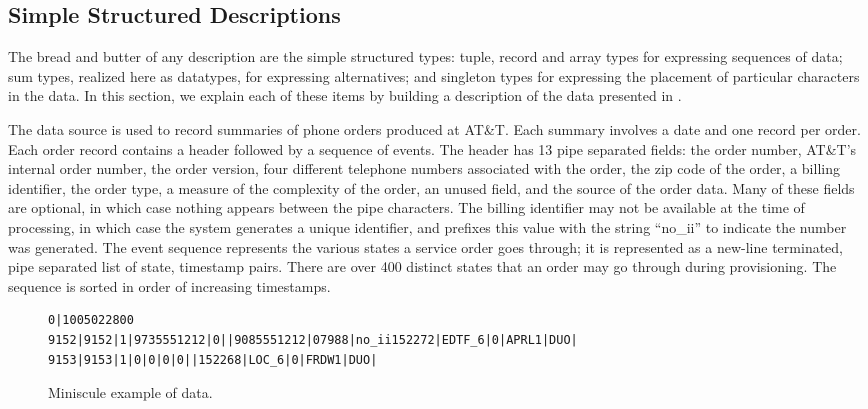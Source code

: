 \subsection{Simple Structured Descriptions}

The bread and butter of any \padsml{} description are the simple
structured types: tuple, record and array types for expressing
sequences of data; sum types, realized here as datatypes, for
expressing alternatives; and singleton types for expressing the
placement of particular characters in the data.  In this section, we
explain each of these items by building a description of the
\dibbler{} data presented in .

The \dibbler{} data source is used to record summaries of phone orders
produced at AT\&T.  Each summary involves a date and one record per
order.  Each order record contains a header followed by a sequence of
events.  The header has 13 pipe separated fields: the order number,
AT\&T's internal order number, the order version, four different
telephone numbers associated with the order, the zip code of the
order, a billing identifier, the order type, a measure of the
complexity of the order, an unused field, and the source of the order
data.  Many of these fields are optional, in which case nothing
appears between the pipe characters.  The billing identifier may not
be available at the time of processing, in which case the system
generates a unique identifier, and prefixes this value with the string
``no\_ii'' to indicate the number was generated. The event sequence
represents the various states a service order goes through; it is
represented as a new-line terminated, pipe separated list of state,
timestamp pairs.  There are over 400 distinct states that an order may
go through during provisioning.  The sequence is sorted in order of
increasing timestamps.


\begin{figure*}
{\scriptsize
\begin{verbatim}
0|1005022800
9152|9152|1|9735551212|0||9085551212|07988|no_ii152272|EDTF_6|0|APRL1|DUO|
9153|9153|1|0|0|0|0||152268|LOC_6|0|FRDW1|DUO|
\end{verbatim}
}
  \caption{Miniscule example of \dibbler{} data.}
  \label{figure:dibbler-records}
\end{figure*}

